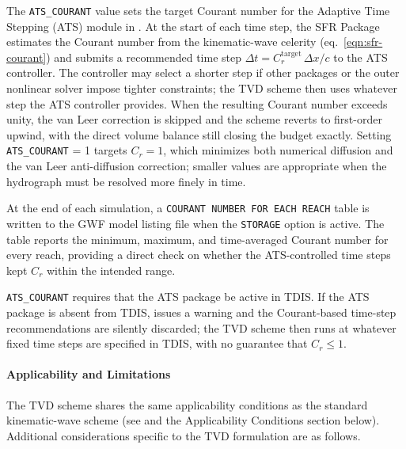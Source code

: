 The \texttt{ATS\_COURANT} value sets the target Courant number for the Adaptive Time Stepping (ATS) module in \mf. At the start of each time step, the SFR Package estimates the Courant number from the kinematic-wave celerity (eq.~\ref{eqn:sfr-courant}) and submits a recommended time step $\Delta t = C_r^\mathrm{target}\,\Delta x / c$ to the ATS controller. The controller may select a shorter step if other packages or the outer nonlinear solver impose tighter constraints; the TVD scheme then uses whatever step the ATS controller provides. When the resulting Courant number exceeds unity, the van Leer correction is skipped and the scheme reverts to first-order upwind, with the direct volume balance still closing the budget exactly. Setting \texttt{ATS\_COURANT} = 1 targets $C_r = 1$, which minimizes both numerical diffusion and the van Leer anti-diffusion correction; smaller values are appropriate when the hydrograph must be resolved more finely in time.

At the end of each simulation, a \texttt{COURANT NUMBER FOR EACH REACH} table is written to the GWF model listing file when the \texttt{STORAGE} option is active. The table reports the minimum, maximum, and time-averaged Courant number for every reach, providing a direct check on whether the ATS-controlled time steps kept $C_r$ within the intended range.

\texttt{ATS\_COURANT} requires that the ATS package be active in TDIS. If the ATS package is absent from TDIS, \mf issues a warning and the Courant-based time-step recommendations are silently discarded; the TVD scheme then runs at whatever fixed time steps are specified in TDIS, with no guarantee that $C_r \le 1$.

\paragraph{Applicability and Limitations}

The TVD scheme shares the same applicability conditions as the standard kinematic-wave scheme (see  and the Applicability Conditions section below). Additional considerations specific to the TVD formulation are as follows.


